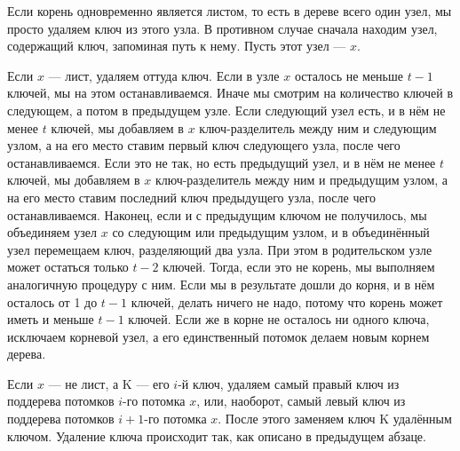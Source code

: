\documentclass[discrete.tex]{subfiles}
\begin{document}
  \begin{alg}
    Если корень одновременно является листом, то есть в дереве всего один узел, мы просто удаляем ключ из этого узла. В противном случае сначала находим узел, содержащий ключ, запоминая путь к нему. Пусть этот узел — $x$.

    Если $x$ — лист, удаляем оттуда ключ. Если в узле $x$ осталось не меньше $t-1$ ключей, мы на этом останавливаемся. Иначе мы смотрим на количество ключей в следующем, а потом в предыдущем узле. Если следующий узел есть, и в нём не менее $t$ ключей, мы добавляем в $x$ ключ-разделитель между ним и следующим узлом, а на его место ставим первый ключ следующего узла, после чего останавливаемся. Если это не так, но есть предыдущий узел, и в нём не менее $t$ ключей, мы добавляем в $x$ ключ-разделитель между ним и предыдущим узлом, а на его место ставим последний ключ предыдущего узла, после чего останавливаемся. Наконец, если и с предыдущим ключом не получилось, мы объединяем узел $x$ со следующим или предыдущим узлом, и в объединённый узел перемещаем ключ, разделяющий два узла. При этом в родительском узле может остаться только $t-2$ ключей. Тогда, если это не корень, мы выполняем аналогичную процедуру с ним. Если мы в результате дошли до корня, и в нём осталось от 1 до $t-1$ ключей, делать ничего не надо, потому что корень может иметь и меньше $t-1$ ключей. Если же в корне не осталось ни одного ключа, исключаем корневой узел, а его единственный потомок делаем новым корнем дерева.

    Если $x$ — не лист, а K — его $i$-й ключ, удаляем самый правый ключ из поддерева потомков $i$-го потомка $x$, или, наоборот, самый левый ключ из поддерева потомков $i+1$-го потомка $x$. После этого заменяем ключ K удалённым ключом. Удаление ключа происходит так, как описано в предыдущем абзаце.
  \end{alg}
\end{document}
